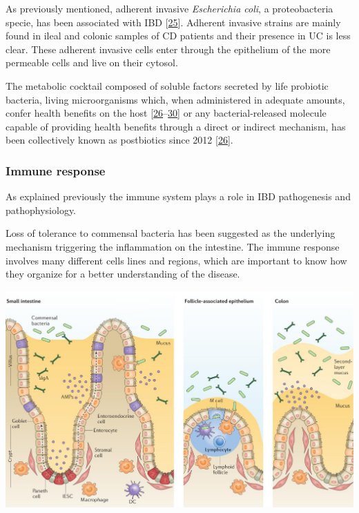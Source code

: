 \documentclass[
  12pt,
  a4paper,
  twoside,
  openright]{book}
\let\origfigure\figure
\let\endorigfigure\endfigure
\renewenvironment{figure}[1][2] {
    \expandafter\origfigure\expandafter[!htp]
} {
    \endorigfigure
}
\begin{document}
As previously mentioned, adherent invasive \emph{Escherichia coli}, a proteobacteria specie, has been associated with IBD {[}\protect\hyperlink{ref-darfeuille-michaud1998}{25}{]}.
Adherent invasive strains are mainly found in ileal and colonic samples of CD patients and their presence in UC is less clear.
These adherent invasive cells enter through the epithelium of the more permeable cells and live on their cytosol.

The metabolic cocktail composed of soluble factors secreted by life probiotic bacteria, living microorganisms which, when administered in adequate amounts, confer health benefits on the host {[}\protect\hyperlink{ref-tsilingiri2012}{26}--\protect\hyperlink{ref-morelli2012}{30}{]} or any bacterial-released molecule capable of providing health benefits through a direct or indirect mechanism, has been collectively known as postbiotics since 2012 {[}\protect\hyperlink{ref-tsilingiri2012}{26}{]}.

\hypertarget{immune-response}{%
\subsubsection{Immune response}\label{immune-response}}

As explained previously the immune system plays a role in IBD pathogenesis and pathophysiology.

Loss of tolerance to commensal bacteria has been suggested as the underlying mechanism triggering the inflammation on the intestine.
The immune response involves many different cells lines and regions, which are important to know how they organize for a better understanding of the disease.

\begin{figure}
\includegraphics[width=1\linewidth]{images/tesis_AC_FigureX} \caption{The intestinal epithelial barrier.}\label{fig:barrier}
\end{figure}
\end{document}
